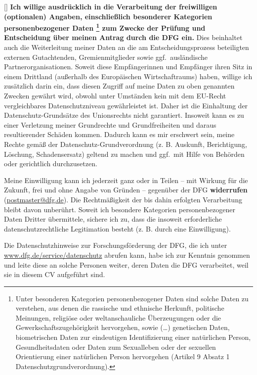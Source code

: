 \documentclass{scrartcl}
\begin{document}
\begin{small}
[\hspace{1em}]
\textbf{Ich willige ausdrücklich in die Verarbeitung der freiwilligen (optionalen) Angaben, einschließlich \glqq{}besonderer Kategorien personenbezogener Daten\grqq{}%
\footnote{Unter besonderen Kategorien personenbezogener Daten sind solche Daten zu verstehen, \glqq{}aus denen die rassische und ethnische Herkunft, politische Meinungen, religiöse oder weltanschauliche Überzeugungen oder die Gewerkschaftszugehörigkeit hervorgehen, sowie (\dots) genetischen Daten, biometrischen Daten zur eindeutigen Identifizierung einer natürlichen Person, Gesundheitsdaten oder Daten zum Sexualleben oder der sexuellen Orientierung einer natürlichen Person\grqq{} hervorgehen (Artikel 9 Absatz 1 Datenschutzgrundverordnung).
} zum Zwecke der Prüfung und Entscheidung über meinen Antrag durch die DFG ein.}
Dies beinhaltet auch die Weiterleitung meiner Daten an die am Entscheidungsprozess beteiligten externen Gutachtenden, Gremienmitglieder sowie ggf.\ ausländische Partnerorganisationen.
Soweit diese Empfängerinnen und Empfänger ihren Sitz in einem Drittland (außerhalb des Europäischen Wirtschaftraums) haben, willige ich zusätzlich darin ein, dass diesen Zugriff auf meine Daten zu oben genannten Zwecken gewährt wird, obwohl unter Umständen kein mit dem EU-Recht vergleichbares Datenschutzniveau gewährleistet ist.
Daher ist die Einhaltung der Datenschutz-Grundsätze des Unionsrechts nicht garantiert.
Insoweit kann es zu einer Verletzung meiner Grundrechte und Grundfreiheiten und daraus resultierender Schäden kommen.
Dadurch kann es mir erschwert sein, meine Rechte gemäß der Datenschutz-Grundverordnung (z. B. Auskunft, Berichtigung, Löschung, Schadensersatz) geltend zu machen und ggf.\ mit Hilfe von Behörden oder gerichtlich durchzusetzen.

Meine Einwilligung kann ich jederzeit ganz oder in Teilen -- mit Wirkung für die Zukunft, frei und ohne Angabe von Gründen -- gegenüber der DFG \textbf{widerrufen} (\href{mailto:postmaster@dfg.de}{postmaster@dfg.de}).
Die Rechtmäßigkeit der bis dahin erfolgten Verarbeitung bleibt davon unberührt.
Soweit ich \glqq{}besondere Kategorien personenbezogener Daten\grqq{} Dritter übermittele, sichere ich zu, dass die insoweit erforderliche datenschutzrechtliche Legitimation besteht (z. B. durch eine Einwilligung).

Die Datenschutzhinweise zur Forschungsförderung der DFG, die ich unter \href{http://www.dfg.de/service/datenschutz}{www.dfg.de/service/da\-ten\-schutz} abrufen kann, habe ich zur Kenntnis genommen und leite diese an solche Personen weiter, deren Daten die DFG verarbeitet, weil sie in diesem CV aufgeführt sind.
\end{small}
\end{document}
